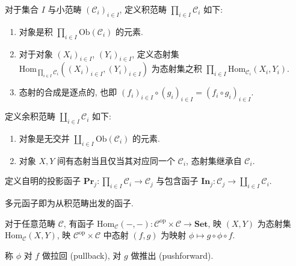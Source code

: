 \begin{definition}
    对于集合 \(I\) 与小范畴 \({(\mathcal{C}_i)}_{i \in I}\), 定义积范畴 \(\prod_{i \in I} \mathcal{C}_i\) 如下:

    \begin{enumerate}
        \item 对象是积 \(\prod_{i \in I} \mathrm{Ob} (\mathcal{C}_i)\) 的元素.
        \item 对于对象 \((X_i)_{i \in I}\), \((Y_i)_{i \in I}\), 定义态射集 \(\mathrm{Hom}_{\prod_{i \in I} \mathcal{C}_i} ((X_i)_{i \in I},(Y_i)_{i \in I})\) 为态射集之积
                \(\prod_{i \in I} \mathrm{Hom}_{\mathcal{C}_i} (X_i,Y_i)\).
        \item 态射的合成是逐点的, 也即 \({(f_i)}_{i \in I} \circ {(g_i)}_{i \in I} = {(f_i \circ g_i)}_{i \in I}\).
    \end{enumerate}

    定义余积范畴 \(\coprod_{i \in I} \mathcal{C}_i\) 如下:

    \begin{enumerate}
        \item 对象是无交并 \(\coprod_{i \in I} \mathrm{Ob} (\mathcal{C}_i)\) 的元素.
        \item 对象 \(X,Y\) 间有态射当且仅当其对应同一个 \(\mathcal{C}_i\), 态射集继承自 \(\mathcal{C}_i\).
    \end{enumerate}

    定义自明的投影函子 \(\mathbf{Pr}_j : \prod_{i \in I} \mathcal{C}_i \to \mathcal{C}_j\) 与包含函子 \(\mathbf{In}_j : \mathcal{C}_j \to \coprod_{i \in I} \mathcal{C}_i\).
\end{definition}

\begin{definition}
    多元函子即为从积范畴出发的函子.
\end{definition}

\begin{definition}[Hom 函子]
    对于任意范畴 \(\mathcal{C}\), 有函子 \(\mathrm{Hom}_{\mathcal{C}} (-,-) : \mathcal{C}^{\mathrm{op}} \times \mathcal{C} \to \mathbf{Set}\), 映 \((X,Y)\) 为态射集 \(\mathrm{Hom}_{\mathcal{C}} (X,Y)\), 
    映 \(\mathcal{C}^{\mathrm{op}} \times \mathcal{C}\) 中态射 \((f,g)\) 为映射 \(\phi \mapsto g \circ \phi \circ f\).

    称 \(\phi\) 对 \(f\) 做拉回 (pullback), 对 \(g\) 做推出 (pushforward).
\end{definition}
